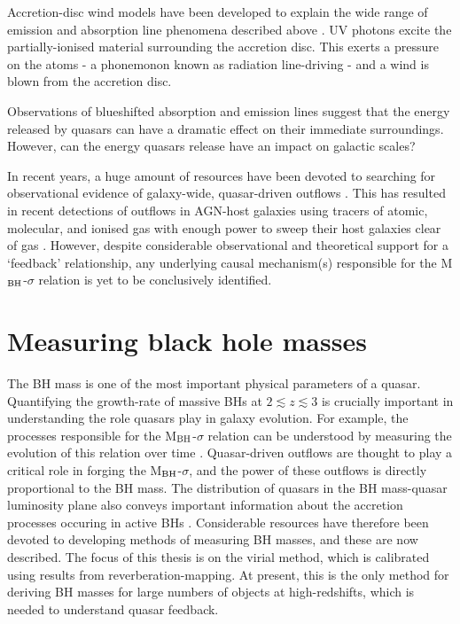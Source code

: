 Accretion-disc wind models have been developed to explain the wide range of emission and absorption line phenomena described above \citep[e.g.][]{murray95,elvis00,proga00,everett05}.
UV photons excite the partially-ionised material surrounding the accretion disc. 
This exerts a pressure on the atoms - a phonemonon known as radiation line-driving - and a wind is blown from the accretion disc. 

Observations of blueshifted absorption and emission lines suggest that the energy released by quasars can have a dramatic effect on their immediate surroundings.  
However, can the energy quasars release have an impact on galactic scales? 

In recent years, a huge amount of resources have been devoted to searching for observational evidence of galaxy-wide, quasar-driven outflows \citep[for recent reviews, see][]{alexander12,fabian12,heckman14}. 
This has resulted in recent detections of outflows in AGN-host galaxies using tracers of atomic, molecular, and ionised gas with enough power to sweep their host galaxies clear of gas \citep[e.g.][]{nesvadba06,arav08,nesvadba08,moe09,dunn10,alexander10,harrison12,harrison14,nesvadba10,rupke13,veilleux13,nardini15,feruglio10,alatalo11,cimatti13,cicone14}.  
However, despite considerable observational and theoretical support for a `feedback' relationship, any underlying causal mechanism(s) responsible for the M$_{\rm BH}$-$\sigma$ relation is yet to be conclusively identified. 

\section{Measuring black hole masses}

The BH mass is one of the most important physical parameters of a quasar. 
Quantifying the growth-rate of massive BHs at $2 \lesssim z \lesssim 3$ is crucially important in understanding the role quasars play in galaxy evolution.
For example, the processes responsible for the M$_{\rm BH}$-$\sigma$ relation can be understood by measuring the evolution of this relation over time \citep[e.g.][]{bennert11}. 
Quasar-driven outflows are thought to play a critical role in forging the M$_{\rm BH}$-$\sigma$, and the power of these outflows is directly proportional to the BH mass. 
The distribution of quasars in the BH mass-quasar luminosity plane also conveys important information about the accretion processes occuring in active BHs \citep[e.g.][]{kollmeier06}.
Considerable resources have therefore been devoted to developing methods of measuring BH masses, and these are now described. 
The focus of this thesis is on the virial method, which is calibrated using results from reverberation-mapping. 
At present, this is the only method for deriving BH masses for large numbers of objects at high-redshifts, which is needed to understand quasar feedback. 


